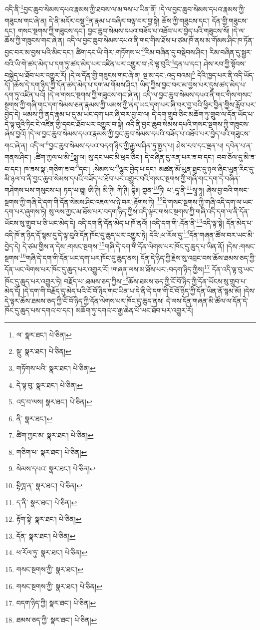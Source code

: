 འདི་ནི་\footnote{ལ་  སྣར་ཐང་།  པེ་ཅིན། }བྱང་ཆུབ་སེམས་དཔའ་རྣམས་ཀྱི་ཐབས་ལ་མཁས་པ་ཡིན་ནོ། །དེ་ལ་བྱང་ཆུབ་སེམས་དཔའ་རྣམས་ཀྱི་གཟུངས་གང་ཞེ་ན། དེ་ནི་མདོར་བསྡུ་\footnote{སྡུ་  སྣར་ཐང་།  པེ་ཅིན། }ན་རྣམ་པ་བཞིར་བལྟ་བར་བྱ་སྟེ། ཆོས་ཀྱི་གཟུངས་དང་། དོན་གྱི་གཟུངས་དང་། གསང་སྔགས་ཀྱི་གཟུངས་དང་། བྱང་ཆུབ་སེམས་དཔའ་བཟོད་པ་འཐོབ་པར་བྱེད་པའི་གཟུངས་སོ། །དེ་ལ་ཆོས་ཀྱི་གཟུངས་གང་ཞེ་ན། འདི་ལ་བྱང་ཆུབ་སེམས་དཔའ་ནི་གང་གིས་ཐོས་པ་ཙམ་ཁོ་ནས་མ་གོམས་ཤིང་ཁ་ཏོན་བྱང་བར་མ་བྱས་པའི་མིང་དང་། ཚིག་དང་ཡི་གེར་:གཏོགས་པ་\footnote{གཏོགས་པའི་  སྣར་ཐང་།  པེ་ཅིན། }རིམ་བཞིན་དུ་བསྡེབས་ཤིང་། རིམ་བཞིན་དུ་སྦྱར་བའི་ཡི་གེ་ཚད་མེད་པ་དག་ཏུ་ཚད་མེད་པར་འཛིན་པར་འགྱུར་བ་:དེ་ལྟ་བུའི་\footnote{དེ་ལྟ་བུ་  སྣར་ཐང་།  པེ་ཅིན། }དྲན་པ་དང་། ཤེས་རབ་ཀྱི་སྟོབས་བསྐྱེད་པ་ཐོབ་པར་འགྱུར་རོ། །དེ་ལ་དོན་གྱི་གཟུངས་གང་ཞེ་ན། སྔ་མ་དང་:འདྲ་བའམ།\footnote{འདྲ་བ་ལས།  སྣར་ཐང་།  པེ་ཅིན། } དེའི་ཁྱད་པར་ནི་འདི་ཡོད་དོ། །ཆོས་དེ་དག་ཉིད་ཀྱི་དོན་ཚད་མེད་པ་དག་མ་གོམས་ཤིང་། ཡིད་ཀྱིས་བྱང་བར་མ་བྱས་པར་དུས་ཚད་མེད་པ་དག་ཏུ་འཛིན་པའོ། །དེ་ལ་གསང་སྔགས་ཀྱི་གཟུངས་གང་ཞེ་ན། འདི་ལ་བྱང་ཆུབ་སེམས་དཔའ་ནི་གང་གིས་གསང་སྔགས་ཀྱི་གཞི་གང་དག་སེམས་ཅན་རྣམས་ཀྱི་ཡམས་ཀྱི་ནད་ཡང་དག་པར་ཞི་བར་བྱ་བའི་ཕྱིར་བྱིན་གྱིས་རློབ་པར་བྱེད་དེ། ཡམས་ཀྱི་ནད་རྣམ་པ་དུ་མ་ཡང་དག་པར་ཞི་བར་བྱ་བ་ལ། དེ་དག་གྲུབ་ཅིང་མཆོག་ཏུ་གྲུབ་ལ་དོན་ཡོད་པ་དེ་ལྟ་བུའི་ཏིང་ངེ་འཛིན་གྱི་དབང་ཐོབ་པར་འགྱུར་བ་སྟེ། འདི་ནི་བྱང་ཆུབ་སེམས་དཔའི་གསང་སྔགས་ཀྱི་གཟུངས་ཞེས་བྱའོ། །དེ་ལ་བྱང་ཆུབ་སེམས་དཔའ་རྣམས་ཀྱི་བྱང་ཆུབ་སེམས་དཔའི་བཟོད་པ་འཐོབ་པར་བྱེད་པའི་གཟུངས་གང་ཞེ་ན། འདི་ལ་\footnote{ནི་  སྣར་ཐང་། }བྱང་ཆུབ་སེམས་དཔའ་བདག་ཉིད་ཀྱི་རྒྱུ་ལ་ཤིན་ཏུ་སྤྱད་པ། ཤེས་རབ་དང་ལྡན་པ། དབེན་པ་ན་གནས་ཤིང་། :ཚིག་ཀྱལ་པ་མི་\footnote{ཚིག་ཀྱང་མ་  སྣར་ཐང་།  པེ་ཅིན། }སྨྲ་ལ། སུ་དང་ཡང་མི་ཕྲད་ཅིང་། དེ་བཞིན་དུ་རན་པར་ཟ་བ་དང་། བབ་ཅོལ་དུ་མི་ཟ་བ་དང་། ཁ་ཟས་སྣ་:གཅིག་ཟ་བ་\footnote{གཅིག་པ་  སྣར་ཐང་།  པེ་ཅིན། }དང་། :སེམས་པ་\footnote{སེམས་དཔའ་  སྣར་ཐང་།  པེ་ཅིན། }ལྷུར་བྱེད་པ་དང་། མཚན་མོ་ཡུན་ཐུང་དུ་ཉལ་ཞིང་ཡུན་རིང་དུ་མི་ཉལ་བ་ནི་བྱང་ཆུབ་སེམས་དཔའི་བཟོད་པ་ཐོབ་པར་འགྱུར་བའི་གསང་སྔགས་ཀྱི་གཞི་གང་དག་དེ་བཞིན་གཤེགས་པས་གསུངས་པ། ཏད་ཡ་ཐཱ། ཨི་ཊི། མི་ཊི། ཀི་ཊི། བྷིཿ། ཀྵན་\footnote{བྷིཀྴ་ན་  སྣར་ཐང་།  པེ་ཅིན། }ཏི། པ་:དཱ་ནི་\footnote{ད་ནི་  སྣར་ཐང་།  པེ་ཅིན། }སྭཱ་ཧཱ། ཞེས་བྱ་བའི་གསང་སྔགས་ཀྱི་གཞི་དེ་དག་གི་དོན་སེམས་ཤིང་འཇལ་ལ་ཉེ་བར་:རྟོགས་ཏེ། \footnote{རྟོག་སྟེ་  སྣར་ཐང་།  པེ་ཅིན། }དེ་གསང་སྔགས་ཀྱི་གཞི་འདི་དག་ལ་ཡང་དག་པར་ཞུགས་ཏེ། སུ་ལས་ཀྱང་མ་ཐོས་པར་བདག་ཉིད་ཀྱིས་འདི་ལྟར་གསང་སྔགས་ཀྱི་གཞི་འདི་དག་ལ་ནི་དོན་ཡོངས་སུ་གྲུབ་པ་ཅི་ཡང་མེད་དེ། འདི་དག་ནི་དོན་མེད་པ་ཁོ་ནའོ། །འདི་དག་གི་:དོན་ནི་\footnote{དོན་  སྣར་ཐང་།  པེ་ཅིན། }འདི་ལྟ་སྟེ། དོན་མེད་པ་འདི་ཁོ་ན་ཉིད་དོ་སྙམ་དུ་དེ་ལྟ་བུའི་དོན་ཁོང་དུ་ཆུད་པར་འགྱུར་ཏེ། དེའི་:ཕ་རོལ་དུ་\footnote{ཕ་རོལ་ཏུ་  སྣར་ཐང་།  པེ་ཅིན། }དོན་གཞན་ཚོལ་བར་ཡང་མི་བྱེད་དེ། དེ་ཙམ་གྱིས་ན་དེས་:གསང་སྔགས་\footnote{གསང་སྔགས་ཀྱི་  སྣར་ཐང་། }གཞི་དེ་དག་གི་དོན་ལེགས་པར་ཁོང་དུ་ཆུད་པ་ཡིན་ནོ། །དེས་:གསང་སྔགས་\footnote{གསང་སྔགས་ཀྱི་  སྣར་ཐང་།  པེ་ཅིན། }གཞི་དེ་དག་གི་དོན་ཡང་དག་པར་ཁོང་དུ་ཆུད་ནས། དོན་དེ་ཉིད་ཀྱི་རྗེས་སུ་འབྲང་བས་ཆོས་ཐམས་ཅད་ཀྱི་དོན་ཡང་ལེགས་པར་ཁོང་དུ་ཆུད་པར་འགྱུར་རོ། །གཞན་ལས་མ་ཐོས་པར་:བདག་ཉིད་ཀྱིས།\footnote{བདག་ཉིད་ཀྱི།  སྣར་ཐང་།  པེ་ཅིན། } དོན་འདི་ལྟ་བུ་ཡང་ཁོང་དུ་ཆུད་པར་འགྱུར་ཏེ། བརྗོད་པ་:ཐམས་ཅད་ཀྱིས་\footnote{ཐམས་ཅད་ཀྱི་  སྣར་ཐང་།  པེ་ཅིན། }ཆོས་ཐམས་ཅད་ཀྱི་ངོ་བོ་ཉིད་ཀྱི་དོན་ཡོངས་སུ་གྲུབ་པ་མེད་དོ། །དེ་དག་གི་བརྗོད་དུ་མེད་པའི་ངོ་བོ་ཉིད་གང་ཡིན་པ་དེ་ནི་དེ་དག་གི་ངོ་བོ་ཉིད་ཀྱི་དོན་ཡིན་ནོ་སྙམ་མོ། །དེས་དེ་ལྟར་ཆོས་ཐམས་ཅད་ཀྱི་ངོ་བོ་ཉིད་ཀྱི་དོན་ལེགས་པར་ཁོང་དུ་ཆུད་ནས། དེ་ལས་དོན་གཞན་མི་ཚོལ་ལ་དོན་དེ་ཁོང་དུ་ཆུད་པས་དགའ་བ་དང་། མཆོག་ཏུ་དགའ་བ་རྒྱ་ཆེན་པོ་ཡང་ཐོབ་པར་འགྱུར་རོ། 
